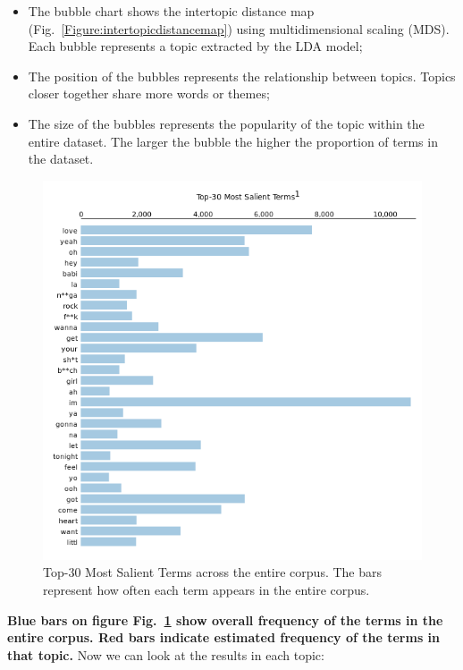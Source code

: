 \begin{itemize}
  \item The bubble chart shows the intertopic distance map
    (Fig.~\ref{Figure:intertopicdistancemap}) using multidimensional scaling
    (MDS). Each bubble represents a topic extracted by the LDA model;
  \item The position of the bubbles represents the relationship between topics.
    Topics closer together share more words or themes;
  \item The size of the bubbles represents the popularity of the topic within
    the entire dataset. The larger the bubble the higher the proportion of
    terms in the dataset.
\end{itemize}



\begin{center}
\begin{figure}[H]
  \centering
  \includegraphics[width=6in]{img/topics/png/general.png}
  \caption{Top-30 Most Salient Terms across the entire corpus. The bars
  represent how often each term appears in the entire corpus.}
  \label{Figure:lda_general}
\end{figure}
\end{center}

\textbf{Blue bars on figure Fig.~\ref{Figure:lda_general} show overall
frequency of the terms in the entire corpus. Red bars indicate estimated
frequency of the terms in that topic.} Now we can look at the results in each
topic:

